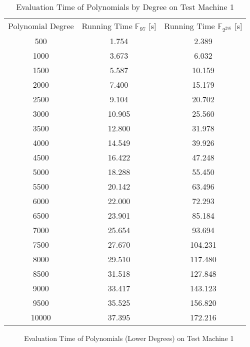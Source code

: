 \begin{table}[ht]
  \centering
  \begin{tabular}{|c|c|c|}
    Polynomial Degree & Running Time $\mathbb{F}_{97}$ [s] & Running Time
    $\mathbb{F}_{2^{256}}$ [s]\\
      500 &  1.754 &   2.389 \\
     1000 &  3.673 &   6.032 \\
     1500 &  5.587 &  10.159 \\
     2000 &  7.400 &  15.179 \\
     2500 &  9.104 &  20.702 \\
     3000 & 10.905 &  25.560 \\
     3500 & 12.800 &  31.978 \\
     4000 & 14.549 &  39.926 \\
     4500 & 16.422 &  47.248 \\
     5000 & 18.288 &  55.450 \\
     5500 & 20.142 &  63.496 \\
     6000 & 22.000 &  72.293 \\
     6500 & 23.901 &  85.184 \\
     7000 & 25.654 &  93.694 \\
     7500 & 27.670 & 104.231 \\
     8000 & 29.510 & 117.480 \\
     8500 & 31.518 & 127.848 \\
     9000 & 33.417 & 143.123 \\
     9500 & 35.525 & 156.820 \\
    10000 & 37.395 & 172.216 \\

  \end{tabular}
  \caption{Evaluation Time of Polynomials by Degree on Test Machine 1}
  \label{tab:poly-deg-t}
\end{table}

\begin{figure}[ht]
  \centering
  
  \caption{Evaluation Time of Polynomials (Lower Degrees) on Test Machine 1}
  \label{fig:poly-deg-t-small}
\end{figure}

